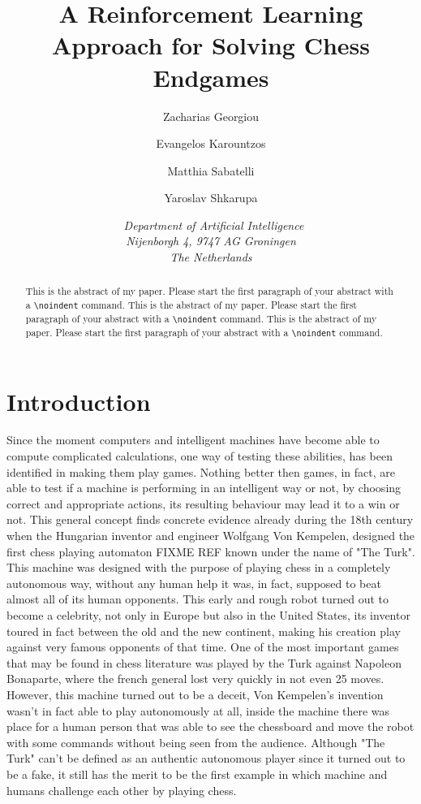 \documentclass{article}
\title{\textbf{\huge A Reinforcement Learning Approach for Solving Chess Endgames}%
}
\author{Zacharias Georgiou \affila \and
    Evangelos Karountzos \affila \and
    Matthia Sabatelli \affila \and
    Yaroslav Shkarupa \affila}
\date{\affila\ \textit{Department of Artificial Intelligence\\
  Nijenborgh 4,
  9747 AG Groningen\\
  The Netherlands }\\
 }
\begin{document}
\ttl
\thispagestyle{empty}


\begin{abstract}
\noindent
This is the abstract of my paper. Please start the first paragraph of your abstract with a \verb+\noindent+ command.
This is the abstract of my paper. Please start the first paragraph of your abstract with a \verb+\noindent+ command.
This is the abstract of my paper. Please start the first paragraph of your abstract with a \verb+\noindent+ command.
\end{abstract}


\section{Introduction}


Since the moment computers and intelligent machines have become able to compute complicated calculations, one way of testing these abilities, has been identified in making them play games. Nothing better then games, in fact, are able to test if a machine is performing in an intelligent way or not, by choosing correct and appropriate actions, its resulting behaviour may lead it to a win or not. This general concept finds concrete evidence already during the 18th century when the Hungarian inventor and engineer Wolfgang Von Kempelen, designed the first chess playing automaton FIXME REF known under the name of "The Turk". This machine was designed with the purpose of playing chess in a completely autonomous way, without any human help it was, in fact, supposed to beat almost all of its human opponents. This early and rough robot turned out to become a celebrity, not only in Europe but also in the United States, its inventor toured in fact between the old and the new continent, making his creation play against very famous opponents of that time. One of the most important games that may be found in chess literature was played by the Turk against Napoleon Bonaparte, where the french general lost very quickly in not even 25 moves. However, this machine turned out to be a deceit, Von Kempelen's invention wasn't in fact able to play autonomously at all, inside the machine there was place for a human person that was able to see the chessboard and move the robot with some commands without being seen from the audience. Although "The Turk" can't be defined as an authentic autonomous player since it turned out to be a fake, it still has the merit to be the first example in which machine and humans challenge each other by playing chess.\\
\end{document}

